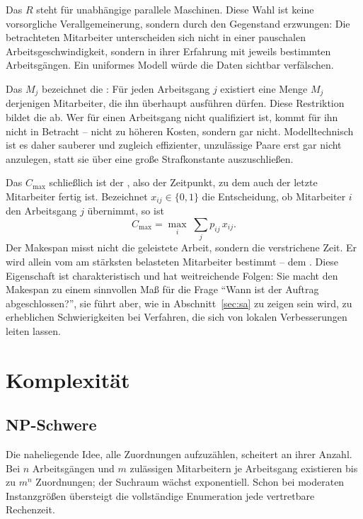 Das $R$ steht für unabhängige parallele Maschinen. Diese Wahl ist keine
vorsorgliche Verallgemeinerung, sondern durch den Gegenstand erzwungen: Die
betrachteten Mitarbeiter unterscheiden sich nicht in einer pauschalen
Arbeitsgeschwindigkeit, sondern in ihrer Erfahrung mit jeweils bestimmten
Arbeitsgängen. Ein uniformes Modell würde die Daten sichtbar verfälschen.

Das $M_j$ bezeichnet die : Für jeden Arbeitsgang
$j$ existiert eine Menge $M_j$ derjenigen Mitarbeiter, die ihn überhaupt
ausführen dürfen. Diese Restriktion bildet die  ab. Wer für
einen Arbeitsgang nicht qualifiziert ist, kommt für ihn nicht in Betracht --
nicht zu höheren Kosten, sondern gar nicht. Modelltechnisch ist es daher
sauberer und zugleich effizienter, unzulässige Paare erst gar nicht anzulegen,
statt sie über eine große Strafkonstante auszuschließen.

Das $C_{\max}$ schließlich ist der , also der Zeitpunkt, zu dem
auch der letzte Mitarbeiter fertig ist. Bezeichnet $x_{ij} \in \{0,1\}$ die
Entscheidung, ob Mitarbeiter $i$ den Arbeitsgang $j$ übernimmt, so ist
\begin{equation}
  C_{\max} = \max_{i} \; \sum_{j} p_{ij}\, x_{ij}.
  \label{eq:makespan}
\end{equation}
Der Makespan misst nicht die geleistete Arbeit, sondern die verstrichene Zeit.
Er wird allein vom am stärksten belasteten Mitarbeiter bestimmt -- dem
. Diese Eigenschaft ist charakteristisch und hat weitreichende
Folgen: Sie macht den Makespan zu einem sinnvollen Maß für die Frage
\enquote{Wann ist der Auftrag abgeschlossen?}, sie führt aber, wie in
Abschnitt~\ref{sec:sa} zu zeigen sein wird, zu erheblichen Schwierigkeiten bei
Verfahren, die sich von lokalen Verbesserungen leiten lassen.

\section{Komplexität}
\label{sec:komplexitaet}

\subsection{NP-Schwere}

Die naheliegende Idee, alle Zuordnungen aufzuzählen, scheitert an ihrer Anzahl.
Bei $n$ Arbeitsgängen und $m$ zulässigen Mitarbeitern je Arbeitsgang existieren
bis zu $m^n$ Zuordnungen; der Suchraum wächst exponentiell. Schon bei moderaten
Instanzgrößen übersteigt die vollständige Enumeration jede vertretbare
Rechenzeit.

